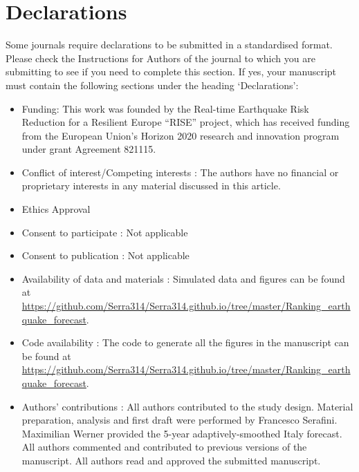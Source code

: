 \documentclass[referee,sn-basic]{sn-jnl}
\theoremstyle{thmstyleone}%
\theoremstyle{thmstyletwo}%
\theoremstyle{thmstylethree}%
\begin{document}
\section*{Declarations}

Some journals require declarations to be submitted in a standardised format. Please check the Instructions for Authors of the journal to which you are submitting to see if you need to complete this section. If yes, your manuscript must contain the following sections under the heading `Declarations':

\begin{itemize}
\item Funding: This work was founded by the Real-time Earthquake Risk Reduction for a Resilient Europe “RISE” project, which has received funding from the European Union's Horizon 2020 research and innovation program under grant Agreement 821115.
\item Conflict of interest/Competing interests : The authors have no financial or proprietary interests in any material discussed in this article.
\item Ethics Approval
\item Consent to participate : Not applicable
\item Consent to publication : Not applicable
\item Availability of data and materials : Simulated data and figures can be found at \url{https://github.com/Serra314/Serra314.github.io/tree/master/Ranking_earthquake_forecast}.
\item Code availability : The code to generate all the figures in the manuscript can be found at 
\url{https://github.com/Serra314/Serra314.github.io/tree/master/Ranking_earthquake_forecast}.
\item Authors' contributions : All authors contributed to the study design. Material preparation, analysis and first draft were performed by Francesco Serafini. Maximilian Werner provided the 5-year adaptively-smoothed Italy forecast. All authors commented and contributed to previous versions of the manuscript. All authors read and approved the submitted manuscript.  
\end{itemize}
\end{document}
